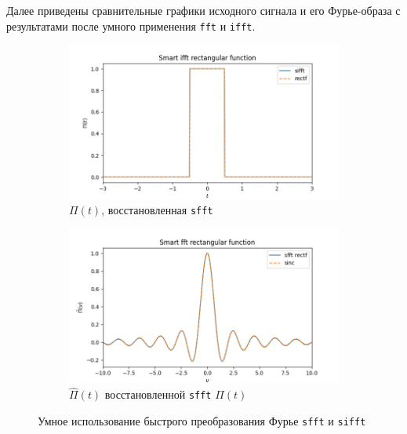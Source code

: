 \documentclass[a4paper, 12pt]{article}
\begin{document}
    Далее приведены сравнительные графики исходного сигнала и его Фурье-образа с результатами после умного применения \texttt{fft} и \texttt{ifft}.
    \begin{figure}[H]
        \centering
        \begin{subfigure}{0.45\textwidth}
            \centering
            \includegraphics[width=\linewidth]{sifft.png}
            \caption{$\Pi(t)$, восстановленная \texttt{sfft}}
            \label{fig:sifft}
        \end{subfigure}
        \hspace{5mm}
        \begin{subfigure}{0.45\textwidth}
            \centering
            \includegraphics[width=\linewidth]{sfft.png}
            \caption{$\hat{\Pi}(t)$ восстановленной \texttt{sfft} $\Pi(t)$}
            \label{fig:sfft}
        \end{subfigure}
        \caption{Умное использование быстрого преобразования Фурье \texttt{sfft} и \texttt{sifft}}
        \label{fig:sffts}
    \end{figure}
\end{document}
